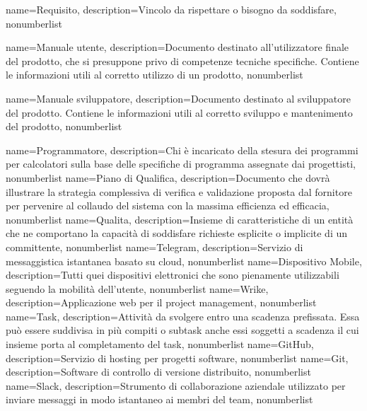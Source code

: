 {
	name={Requisito},
	description={Vincolo da rispettare o bisogno da soddisfare},
	nonumberlist 
}

{
	name={Manuale utente},
	description={Documento destinato all'utilizzatore finale del prodotto, che si presuppone privo di competenze tecniche specifiche. Contiene le informazioni utili al corretto utilizzo di un prodotto},
	nonumberlist 
}

{
	name={Manuale sviluppatore},
	description={Documento destinato al sviluppatore del prodotto. Contiene le informazioni utili al corretto sviluppo e mantenimento del prodotto},
	nonumberlist 
}

{
	name={Programmatore},
	description={Chi è incaricato della stesura dei programmi per calcolatori sulla base delle specifiche di programma assegnate dai progettisti},
	nonumberlist 
}
{
	name={Piano di Qualifica},
	description={Documento che dovrà illustrare la strategia complessiva di verifica e validazione proposta dal fornitore per pervenire al collaudo del sistema con la massima efficienza ed efficacia},
	nonumberlist 
}
{
	name={Qualita},
	description={Insieme di caratteristiche di un entità che ne comportano la capacità di soddisfare richieste esplicite o implicite di un committente},
	nonumberlist 
}
{
	name={Telegram},
	description={Servizio di messaggistica istantanea basato su cloud},
	nonumberlist 
}
{
	name={Dispositivo Mobile},
	description={Tutti quei dispositivi elettronici che sono pienamente utilizzabili seguendo la mobilità dell'utente},
	nonumberlist 
}
{
	name={Wrike},
	description={Applicazione web per il project management},
	nonumberlist 
}
{
	name={Task},
	description={Attività da svolgere entro una scadenza prefissata. Essa può essere suddivisa in più compiti o subtask anche essi soggetti a scadenza il cui insieme porta al completamento del task},
	nonumberlist 
}
{
	name={GitHub},
	description={Servizio di hosting per progetti software},
	nonumberlist 
}
{
	name={Git},
	description={Software di controllo di versione distribuito},
	nonumberlist
}
{
	name={Slack},
	description={Strumento di collaborazione aziendale utilizzato per inviare messaggi in modo istantaneo ai membri del team},
	nonumberlist
}
